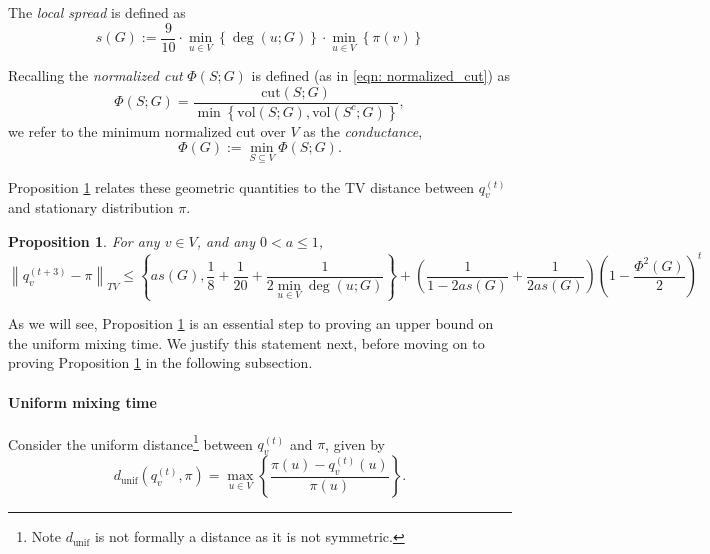 \documentclass[11pt,twoside]{article}
\newtheorem{proposition}{Proposition}
\newcommand{\set}[1]{\left\{#1\right\}}
\newcommand{\vol}{\mathrm{vol}}
\newcommand{\cut}{\mathrm{cut}}
\newcommand{\norm}[1]{\left\lVert#1\right\rVert}
\newcommand{\1}{\mathbf{1}}
\begin{document}
The \emph{local spread} is defined as
\begin{equation*}
s(G) := \frac{9}{10} \cdot \min_{u \in V} \set{\deg(u; G)} \cdot \min_{u \in V} \set{\pi(v)}
\end{equation*}

Recalling the \emph{normalized cut} $\Phi(S;G)$ is defined (as in \eqref{eqn: normalized_cut}) as
\begin{equation*}
\Phi(S;G) = \frac{\cut(S; G)}{\min\set{\vol(S; G),\vol(S^c; G)}},
\end{equation*}
we refer to the minimum normalized cut over $V$ as the \emph{conductance},
\begin{equation*}
\Phi(G) := \min_{S \subseteq V} \Phi(S;G).
\end{equation*}

Proposition \ref{prop: tv_mixing_time} relates these geometric quantities to the TV distance between $q_v^{(t)}$ and stationary distribution $\pi$.
\begin{proposition}
	\label{prop: tv_mixing_time}
	For any $v \in V$, and any $0 < a \leq 1$,
	\begin{equation*}
	\norm{q_v^{(t + 3)} - \pi}_{TV} \leq \set{as(G), \frac{1}{8} + \frac{1}{20} + \frac{1}{2 \min_{u \in V} \deg(u;G)}} + \left(\frac{1}{1 - 2as(G)} + \frac{1}{2 as(G)}\right) \left(1 - \frac{\Phi^2(G)}{2}\right)^t
	\end{equation*}
\end{proposition}

As we will see, Proposition \ref{prop: tv_mixing_time} is an essential step to proving an upper bound on the uniform mixing time. We justify this statement next, before moving on to proving Proposition \ref{prop: tv_mixing_time} in the following subsection.

\paragraph{Uniform mixing time}
Consider the uniform distance\footnote{Note $d_{\textrm{unif}}$ is not formally a distance as it is not symmetric.} between $q_v^{(t)}$ and $\pi$, given by
\begin{equation*}
d_{\textrm{unif}}(q_v^{(t)},\pi) = \max_{u \in V} \set{\frac{\pi(u) - q_v^{(t)}(u)}{\pi(u)}}.
\end{equation*}
\end{document}
